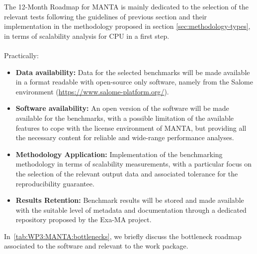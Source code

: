 The 12-Month Roadmap for MANTA is mainly dedicated to the selection of the relevant tests following the guidelines of previous section and their implementation in the methodology proposed in section \ref{sec:methodology-types}, in terms of scalability analysis for CPU in a first step.\\
\\
Practically:
\begin{itemize}
    \item \textbf{Data availability:} Data for the selected benchmarks will be made available in a format readable with open-source only software, namely from the Salome environment (\href{https://www.salome-platform.org/}{https://www.salome-platform.org/}).
    \item \textbf{Software availability: } An open version of the software will be made available for the benchmarks, with a possible limitation of the available features to cope with the license environment of MANTA, but providing all the necessary content for reliable and wide-range performance analyses.
    \item \textbf{Methodology Application:} Implementation of the benchmarking methodology in terms of scalability measurements, with a particular focus on the selection of the relevant output data and associated tolerance for the reproducibility guarantee.
    \item \textbf{Results Retention:} Benchmark results will be stored and made available with the suitable level of metadata and documentation through a dedicated repository proposed by the Exa-MA project.
\end{itemize}

In~\cref{tab:WP3:MANTA:bottlenecks}, we briefly discuss the bottleneck roadmap associated to the software and relevant to the work package.


